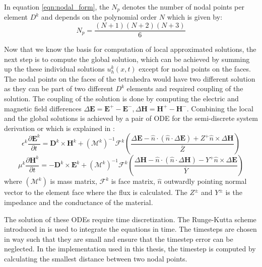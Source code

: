 In equation \ref{eqn:nodal_form}, the $ N_p $ denotes the number of nodal points per element $ D^k $
and depends on the polynomial order $ N $ which is given by:
\begin{equation}\label{eqn:nprelation}
    N_p = \frac{(N+1)(N+2)(N+3)}{6}
\end{equation}

Now that we know the basis for computation of local approximated solutions,
the next step is to compute the global solution, which can be achieved by summing
up the these individual solutions $ u_h^k(x,t) $ except for nodal points on the faces.
The nodal points on the faces of the tetrahedra would have two different solution
as they can be part of two different $ D^k $ elements and required coupling of the
solution. The coupling of the solution is done by computing the electric and
magnetic field differences \cite{kenter_opencl-based_2018} $\Delta \textbf{E}
= \textbf{E}^+-\textbf{E}^-, \Delta \textbf{H} = \textbf{H}^+ - \textbf{H}^-$.
Combining the local and the global solutions is achieved \cite{kenter_opencl-based_2018, busch_discontinuous_2011}
by a pair of \ac{ODE} for the semi-discrete system derivation or which is explained in
\cite{hesthaven_nodal_2008}:
\begin{equation}\label{eqn:pde_e}
\epsilon^k \frac{\partial \textbf{E}^k}{\partial t} = \textbf{D}^k \times \textbf{H}^k
+ (\mathcal{M}^k)^{-1}\mathcal{F}^k \left( \frac{\Delta\textbf{E}-\hat{n} \cdot (\hat{n} \cdot \Delta \textbf{E})+Z^+ \hat{n} \times \Delta \textbf{H} }{\overline{Z}} \right)
\end{equation}
\begin{equation}\label{eqn:pde_h}
    \mu^k \frac{\partial \textbf{H}^k}{\partial t} = - \textbf{D}^k \times \textbf{E}^k
    + (\mathcal{M}^k)^{-1} \mathcal{F}^k \left ( \frac{\Delta \textbf{H} -\hat{n} \cdot (\hat{n} \cdot \Delta \textbf{H})-Y^+ \hat{n} \times \Delta \textbf{E}}{\overline{Y}} \right)
\end{equation}
where $ (\mathcal{M}^k) $ is mass matrix, $\mathcal{F}^k$ is face matrix, $\hat{n}$ outwardly
pointing normal vector to the element face where the flux is calculated. The $ Z^\pm $ and $Y^\pm$ is the impedance and the conductance of the material.

The solution of these \ac{ODE}s require time discretization. The Runge-Kutta
scheme introduced in \cite{shu_total-variation-diminishing_1988} is used
\cite{hesthaven_nodal_2008, kenter_opencl-based_2018} to integrate the
equations in time. The timesteps are chosen in way such that they are small
and ensure that the timestep error can be neglected. In the implementation used
in this thesis, the timestep is computed by calculating the smallest distance between two nodal points.

